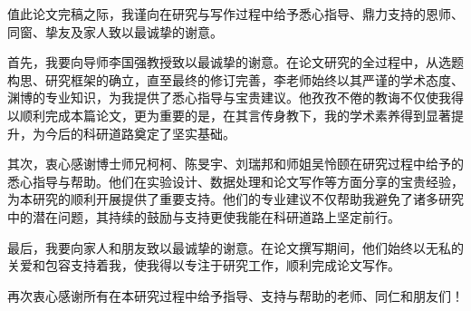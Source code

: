
\begin{acknowledgements}
  值此论文完稿之际，我谨向在研究与写作过程中给予悉心指导、鼎力支持的恩师、同窗、挚友及家人致以最诚挚的谢意。

  首先，我要向导师李国强教授致以最诚挚的谢意。在论文研究的全过程中，从选题构思、研究框架的确立，直至最终的修订完善，李老师始终以其严谨的学术态度、渊博的专业知识，为我提供了悉心指导与宝贵建议。他孜孜不倦的教诲不仅使我得以顺利完成本篇论文，更为重要的是，在其言传身教下，我的学术素养得到显著提升，为今后的科研道路奠定了坚实基础。

  其次，衷心感谢博士师兄柯柯、陈旻宇、刘瑞邦和师姐吴怜颐在研究过程中给予的悉心指导与帮助。他们在实验设计、数据处理和论文写作等方面分享的宝贵经验，为本研究的顺利开展提供了重要支持。他们的专业建议不仅帮助我避免了诸多研究中的潜在问题，其持续的鼓励与支持更使我能在科研道路上坚定前行。

  最后，我要向家人和朋友致以最诚挚的谢意。在论文撰写期间，他们始终以无私的关爱和包容支持着我，使我得以专注于研究工作，顺利完成论文写作。

  再次衷心感谢所有在本研究过程中给予指导、支持与帮助的老师、同仁和朋友们！
\end{acknowledgements}
